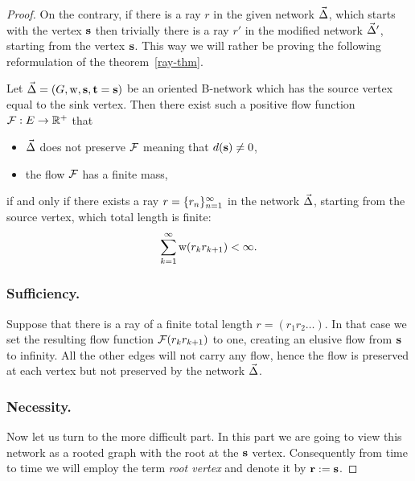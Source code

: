\documentclass[12pt]{article}
\begin{document}
\begin{proof}
      On the contrary, if there is a ray $r$ in the given network $\vec{\Delta}$, which starts with the vertex $\mathbf{s}$
        then trivially there is a ray $r'$ in the modified network $\vec{\Delta}'$, starting from the vertex $\mathbf{s}$.
      This way we will rather be proving the following reformulation of the theorem~\ref{ray-thm}.
      \begin{theorem*}
        Let $\vec{\Delta} = (G, \mathrm{w}, \mathbf{s}, \mathbf{t} = \mathbf{s})$ be an oriented B-network which has
          the source vertex equal to the sink vertex.
        Then there exist such a positive flow function $\mathcal{F}: E \to \mathbb{R}^{+}$ that
        \begin{itemize}
          \item $\vec{\Delta}$ does not preserve $\mathcal{F}$ meaning that $d(\mathbf{s}) \neq 0$,
          \item the flow $\mathcal{F}$ has a finite mass,
        \end{itemize}
          if and only if there exists a ray $r = \{{r}_n\}_{n=1}^\infty$ in the network $\vec{\Delta}$, starting from the source vertex, which total length is finite:
          \[
            \sum_{k=1}^\infty \mathrm{w}(r_k r_{k+1}) < \infty.
          \]
      \end{theorem*}
      \subsubsection*{Sufficiency.}
      Suppose that there is a ray of a finite total length $r=(r_1 r_2 \dots)$. 
      In that case we set the resulting flow function $\mathcal{F}(r_k r_{k+1})$ to one, creating an elusive flow
        from $\mathbf{s}$ to infinity. All the other edges will not carry any flow, hence the flow is preserved
        at each vertex but not preserved by the network $\vec{\Delta}$.
      \subsubsection*{Necessity.}
      Now let us turn to the more difficult part.
      In this part we are going to view this network as a rooted graph with the root at the $\mathbf{s}$ vertex.
      Consequently from time to time we will employ the term \emph{root vertex} and denote it by $\mathbf{r} := \mathbf{s}$.


\end{proof}
\end{document}
